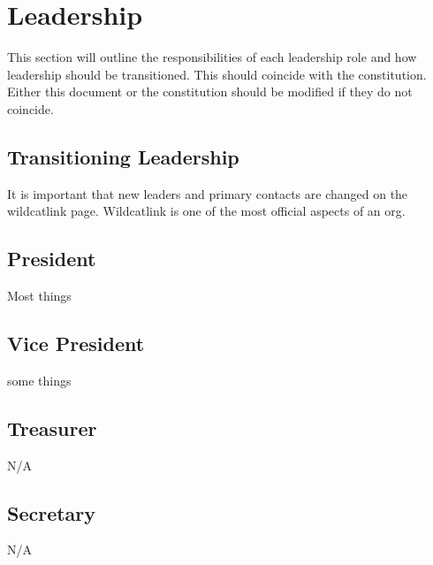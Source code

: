 \documentclass[12pt,epsfig]{article}
\begin{document}
\section{Leadership}
This section will outline the responsibilities of each leadership role and how leadership should be transitioned. This should coincide with the constitution. Either this document or the constitution should be modified if they do not coincide.

\subsection{Transitioning Leadership}
It is important that new leaders and primary contacts are changed on the wildcatlink page. Wildcatlink is one of the most official aspects of an org. 

\subsection{President}
Most things

\subsection{Vice President}
some things

\subsection{Treasurer}
N/A

\subsection{Secretary}
N/A
\end{document}
